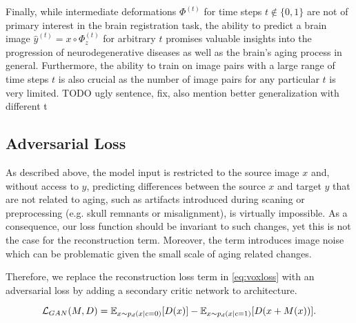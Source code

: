 Finally, while intermediate deformations $\Phi^{(t)}$ for time steps $t \notin \{0, 1\}$ are not of primary interest in the brain registration task, the ability to predict a brain image $\hat y^{(t)} = x \circ \Phi_z^{(t)}$ for arbitrary $t$ promises valuable insights into the progression of neurodegenerative diseases as well as the brain's aging process in general.
Furthermore, the ability to train on image pairs with a large range of time steps $t$ is also crucial as the number of image pairs for any particular $t$ is very limited. TODO ugly sentence, fix, also mention better generalization with different t

\subsection{Adversarial Loss}

As described above, the model input is restricted to the source image $x$ and, without access to $y$, predicting differences between the source $x$ and target $y$ that are not related to aging, such as artifacts introduced during scaning or preprocessing (e.g. skull remnants or misalignment), is virtually impossible. As a consequence, our loss function should be invariant to such changes, yet this is not the case for the reconstruction term. Moreover, the term introduces image noise which can be problematic given the small scale of aging related changes.


Therefore, we replace the reconstruction loss term in \autoref{eq:voxloss} with an adversarial loss by adding a secondary critic network to architecture.



\begin{equation}
	\mathcal{L}_{GAN}(M, D) = \mathbb{E} _ { x \sim p_d(x | c = 0) } [ D (x) ] 
	 - \mathbb{E} _ { x \sim p_d(x | c = 1) } [ D (x + M(x)) ].
\end{equation}

